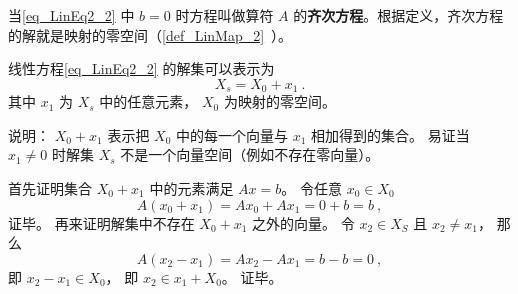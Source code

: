 当\autoref{eq_LinEq2_2} 中 $b = 0$ 时方程叫做算符 $A$ 的\textbf{齐次方程}。根据定义，齐次方程的解就是映射的零空间（\autoref{def_LinMap_2}~）。

\begin{theorem}{}\label{the_LinEq2_1}
线性方程\autoref{eq_LinEq2_2} 的解集可以表示为
\begin{equation}\label{eq_LinEq2_1}
X_s = X_0 + x_1~.
\end{equation}
其中 $x_1$ 为 $X_s$ 中的任意元素，  $X_0$ 为映射的零空间。
\end{theorem}
说明： $X_0 + x_1$ 表示把 $X_0$ 中的每一个向量与 $x_1$ 相加得到的集合。 易证当 $x_1 \ne 0$ 时解集 $X_s$ 不是一个向量空间（例如不存在零向量）。

首先证明集合 $X_0 + x_1$ 中的元素满足 $Ax = b$。 令任意 $x_0 \in X_0$
\begin{equation}
A(x_0 + x_1) = Ax_0 + Ax_1 = 0 + b = b~,
\end{equation}
证毕。 再来证明解集中不存在 $X_0 + x_1$ 之外的向量。 令 $x_2 \in X_S$ 且 $x_2 \ne x_1$， 那么
\begin{equation}
A(x_2 - x_1) = Ax_2 - Ax_1 = b - b = 0~,
\end{equation}
即 $x_2 - x_1 \in X_0$， 即 $x_2 \in x_1 + X_0$。 证毕。



